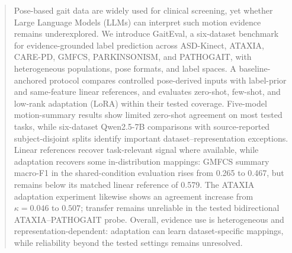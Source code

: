 \begin{abstract}
Pose-based gait data are widely used for clinical screening, yet whether Large Language Models (LLMs) can interpret such motion evidence remains underexplored.
We introduce GaitEval, a six-dataset benchmark for evidence-grounded label prediction across ASD-Kinect, ATAXIA, CARE-PD, GMFCS, PARKINSONISM, and PATHOGAIT, with heterogeneous populations, pose formats, and label spaces.
A baseline-anchored protocol compares controlled pose-derived inputs with label-prior and same-feature linear references, and evaluates zero-shot, few-shot, and low-rank adaptation (LoRA) within their tested coverage.
Five-model motion-summary results show limited zero-shot agreement on most tested tasks, while six-dataset Qwen2.5-7B comparisons with source-reported subject-disjoint splits identify important dataset--representation exceptions.
Linear references recover task-relevant signal where available, while adaptation recovers some in-distribution mappings: GMFCS summary macro-F1 in the shared-condition evaluation rises from 0.265 to 0.467, but remains below its matched linear reference of 0.579.
The ATAXIA adaptation experiment likewise shows an agreement increase from $\kappa=0.046$ to $0.507$; transfer remains unreliable in the tested bidirectional ATAXIA--PATHOGAIT probe.
Overall, evidence use is heterogeneous and representation-dependent: adaptation can learn dataset-specific mappings, while reliability beyond the tested settings remains unresolved.
\end{abstract}
